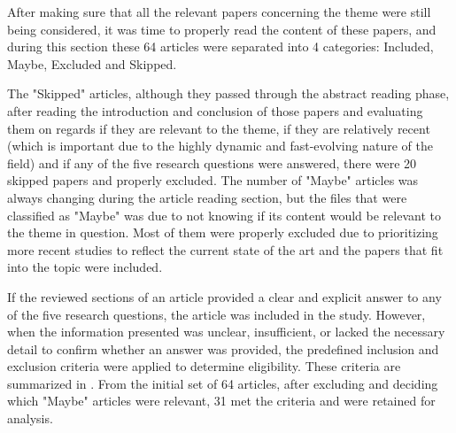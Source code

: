 After making sure that all the relevant papers concerning the theme were still being considered, it was time to properly read the content of these papers, and during this section these 64 articles were separated into 4 categories: Included, Maybe, Excluded and Skipped. 

The "Skipped" articles, although they passed through the abstract reading phase, after reading the introduction and conclusion of those papers and evaluating them on regards if they are relevant to the theme, if they are relatively recent (which is important due to the highly dynamic and fast-evolving nature of the field) and if any of the five research questions were answered, there were 20 skipped papers and properly excluded. The number of "Maybe" articles was always changing during the article reading section, but the files that were classified as "Maybe" was due to not knowing if its content would be relevant to the theme in question. Most of them were properly excluded due to prioritizing more recent studies to reflect the current state of the art and the papers that fit into the topic were included.

If the reviewed sections of an article provided a clear and explicit answer to any of the five research questions, the article was included in the study. However, when the information presented was unclear, insufficient, or lacked the necessary detail to confirm whether an answer was provided, the predefined inclusion and exclusion criteria were applied to determine eligibility. These criteria are summarized in . From the initial set of 64 articles, after excluding and deciding which "Maybe" articles were relevant, 31 met the criteria and were retained for analysis.

